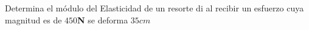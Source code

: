 
\question Determina el módulo del Elasticidad de un resorte di al recibir un
          esfuerzo cuya magnitud es de $450$\textbf{N} se deforma $35 cm$

